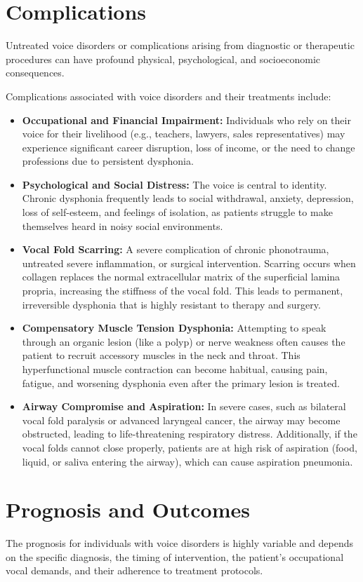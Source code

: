 \section*{Complications}
Untreated voice disorders or complications arising from diagnostic or therapeutic procedures can have profound physical, psychological, and socioeconomic consequences.

Complications associated with voice disorders and their treatments include:
\begin{itemize}
    \item \textbf{Occupational and Financial Impairment:} Individuals who rely on their voice for their livelihood (e.g., teachers, lawyers, sales representatives) may experience significant career disruption, loss of income, or the need to change professions due to persistent dysphonia.
    \item \textbf{Psychological and Social Distress:} The voice is central to identity. Chronic dysphonia frequently leads to social withdrawal, anxiety, depression, loss of self-esteem, and feelings of isolation, as patients struggle to make themselves heard in noisy social environments.
    \item \textbf{Vocal Fold Scarring:} A severe complication of chronic phonotrauma, untreated severe inflammation, or surgical intervention. Scarring occurs when collagen replaces the normal extracellular matrix of the superficial lamina propria, increasing the stiffness of the vocal fold. This leads to permanent, irreversible dysphonia that is highly resistant to therapy and surgery.
    \item \textbf{Compensatory Muscle Tension Dysphonia:} Attempting to speak through an organic lesion (like a polyp) or nerve weakness often causes the patient to recruit accessory muscles in the neck and throat. This hyperfunctional muscle contraction can become habitual, causing pain, fatigue, and worsening dysphonia even after the primary lesion is treated.
    \item \textbf{Airway Compromise and Aspiration:} In severe cases, such as bilateral vocal fold paralysis or advanced laryngeal cancer, the airway may become obstructed, leading to life-threatening respiratory distress. Additionally, if the vocal folds cannot close properly, patients are at high risk of aspiration (food, liquid, or saliva entering the airway), which can cause aspiration pneumonia.
\end{itemize}

\section*{Prognosis and Outcomes}
The prognosis for individuals with voice disorders is highly variable and depends on the specific diagnosis, the timing of intervention, the patient's occupational vocal demands, and their adherence to treatment protocols.

